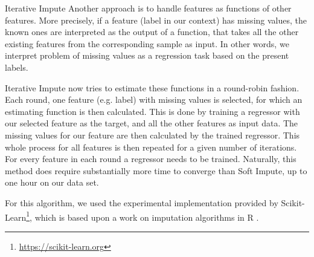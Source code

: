 \begin{subsection}{Iterative Impute}
	Another approach is to handle features as functions of other features. More precisely, if a feature (label in our context) has missing values, the known ones are interpreted as the output of a function, that takes all the other existing features from the corresponding sample as input. In other words, we interpret problem of missing values as a regression task based on the present labels. \par
	Iterative Impute now tries to estimate these functions in a round-robin fashion. Each round, one feature (e.g. label) with missing values is selected, for which an estimating function is then calculated. This is done by training a regressor with our selected feature as the target, and all the other features as input data. The missing values for our feature are then calculated by the trained regressor. This whole process for all features is then repeated for a given number of iterations. For every feature in each round a regressor needs to be trained. Naturally, this method does require substantially more time to converge than Soft Impute, up to one hour on our data set. \par
	
	For this algorithm, we used the experimental implementation provided by Scikit-Learn\footnote{\href{https://scikit-learn.org/stable/}{https://scikit-learn.org}}, which is based upon a work on imputation algorithms in R \cite{buuren2010mice}.
\end{subsection}

